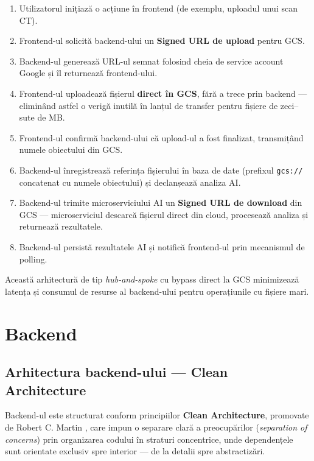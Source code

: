 \documentclass[12pt, a4paper]{report}
\begin{document}
\begin{enumerate}
    \item Utilizatorul inițiază o acțiune în frontend (de exemplu, uploadul unui scan CT).
    \item Frontend-ul solicită backend-ului un \textbf{Signed URL de upload} pentru GCS.
    \item Backend-ul generează URL-ul semnat folosind cheia de service account Google și
          îl returnează frontend-ului.
    \item Frontend-ul uploadează fișierul \textbf{direct în GCS}, fără a trece prin
          backend --- eliminând astfel o verigă inutilă în lanțul de transfer pentru
          fișiere de zeci--sute de MB.
    \item Frontend-ul confirmă backend-ului că upload-ul a fost finalizat, transmițând
          numele obiectului din GCS.
    \item Backend-ul înregistrează referința fișierului în baza de date (prefixul
          \texttt{gcs://} concatenat cu numele obiectului) și declanșează analiza AI.
    \item Backend-ul trimite microserviciului AI un \textbf{Signed URL de download} din
          GCS --- microserviciul descarcă fișierul direct din cloud, procesează analiza
          și returnează rezultatele.
    \item Backend-ul persistă rezultatele AI și notifică frontend-ul prin mecanismul
          de polling.
\end{enumerate}

Această arhitectură de tip \textit{hub-and-spoke} cu bypass direct la GCS minimizează
latența și consumul de resurse al backend-ului pentru operațiunile cu fișiere mari.

\section{Backend}
\subsection{Arhitectura backend-ului --- Clean Architecture}

Backend-ul este structurat conform principiilor \textbf{Clean Architecture}, promovate de
Robert C. Martin \cite{martin2017clean}, care impun o separare clară a preocupărilor
(\textit{separation of concerns}) prin organizarea codului în straturi concentrice, unde
dependențele sunt orientate exclusiv spre interior --- de la detalii spre abstractizări.
\end{document}
